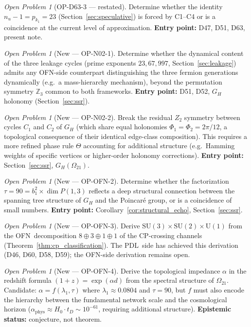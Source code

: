 \documentclass[11pt,a4paper]{article}
\theoremstyle{plain}
\theoremstyle{definition}
\theoremstyle{remark}
\newtheorem{openproblem}[theorem]{Open Problem}
\newcommand{\PDL}{\textnormal{PDL}}
\newcommand{\OFN}{\textnormal{OFN}}
\newcommand{\Zthree}{\mathbb{Z}_3}
\newcommand{\nuu}{n_u}
\newcommand{\pkone}{p_{k_1}}
\begin{document}
\begin{openproblem}[OP-D63-3 --- restated]
Determine whether the identity $\nuu - 1 = \pkone = 23$ (Section~\ref{sec:speculative}) is forced by C1--C4 or is a coincidence at the current level of approximation. \textbf{Entry point:} D47, D51, D63, present note.
\end{openproblem}

\begin{openproblem}[New --- OP-N02-1]
Determine whether the dynamical content of the three leakage cycles (prime exponents $23, 67, 997$, Section~\ref{sec:leakage}) admits any \OFN-side counterpart distinguishing the three fermion generations dynamically (e.g.\ a mass-hierarchy mechanism), beyond the permutation symmetry $\Zthree$ common to both frameworks. \textbf{Entry point:} D51, D52, $G_H$ holonomy (Section~\ref{sec:ssr}).
\end{openproblem}

\begin{openproblem}[New --- OP-N02-2]
Break the residual $Z_2$ symmetry between cycles $C_1$ and $C_2$ of $G_H$ (which share equal holonomies $\Phi_1 = \Phi_2 = 2\pi/12$, a topological consequence of their identical edge-class composition). This requires a more refined phase rule $\Theta$ accounting for additional structure (e.g.\ Hamming weights of specific vertices or higher-order holonomy corrections). \textbf{Entry point:} Section~\ref{sec:ssr}, $G_H(\Omega_{21})$.
\end{openproblem}

\begin{openproblem}[New --- OP-OFN-2]
Determine whether the factorization $\tau = 90 = b_1^2 \times \dim P(1,3)$ reflects a deep structural connection between the spanning tree structure of $G_H$ and the Poincaré group, or is a coincidence of small numbers. \textbf{Entry point:} Corollary~\ref{cor:structural_echo}, Section~\ref{sec:ssr}.
\end{openproblem}

\begin{openproblem}[New --- OP-OFN-3]
Derive $\mathrm{SU}(3)\times\mathrm{SU}(2)\times\mathrm{U}(1)$ from the \OFN\ decomposition $8\oplus 3\oplus 1\oplus 1$ of the CP-crossing channels (Theorem~\ref{thm:cp_classification}). The \PDL\ side has achieved this derivation (D46, D60, D58, D59); the \OFN-side derivation remains open.
\end{openproblem}

\begin{openproblem}[New --- OP-OFN-4]
Derive the topological impedance $\alpha$ in the redshift formula $(1+z) = \exp(\alpha d)$ from the spectral structure of $\Omega_{21}$. Candidate: $\alpha = f(\lambda_1, \tau)$ where $\lambda_1\approx0.0804$ and $\tau=90$, but $f$ must also encode the hierarchy between the fundamental network scale and the cosmological horizon ($\alpha_{\mathrm{phys}}\approx H_0\cdot t_D\sim10^{-61}$, requiring additional structure). \textbf{Epistemic status:} conjecture, not theorem.
\end{openproblem}
\end{document}
